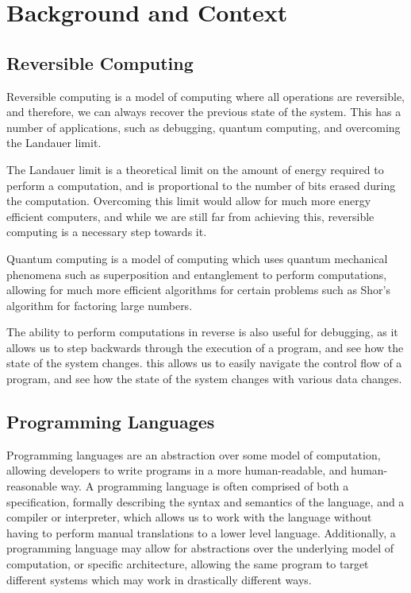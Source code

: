 \section*{Background and Context}

\subsection*{Reversible Computing}\label{subsec:rev-comp}
Reversible computing is a model of computing where all operations are reversible, and therefore, we can always recover the previous state of the system.
This has a number of applications, such as debugging, quantum computing, and overcoming the Landauer limit\cite{LandauerLimit, debug, richardpFeynmanLecturesComputation2018}.

The Landauer limit is a theoretical limit on the amount of energy required to perform a computation, and is proportional to the number of bits erased during the computation.
Overcoming this limit would allow for much more energy efficient computers, and while we are still far from achieving this, reversible computing is a necessary step towards it.

Quantum computing is a model of computing which uses quantum mechanical phenomena such as superposition and entanglement to perform computations, allowing for much more efficient algorithms for certain problems such as Shor's algorithm for factoring large numbers.

The ability to perform computations in reverse is also useful for debugging, as it allows us to step backwards through the execution of a program, and see how the state of the system changes.
this allows us to easily navigate the control flow of a program, and see how the state of the system changes with various data changes.

\subsection*{Programming Languages}\label{subsec:pl}
Programming languages are an abstraction over some model of computation, allowing developers to write programs in a more human-readable, and human-reasonable way.
A programming language is often comprised of both a specification, formally describing the syntax and semantics of the language, and a compiler or interpreter, which allows us to work with the language without having to perform manual translations to a lower level language.
Additionally, a programming language may allow for abstractions over the underlying model of computation, or specific architecture, allowing the same program to target different systems which may work in drastically different ways.

